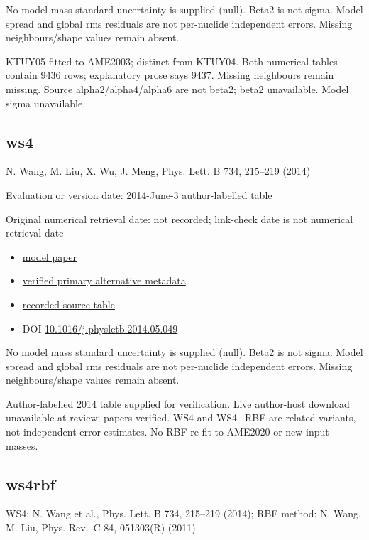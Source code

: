 \documentclass[
  11pt,
  letterpaper,
]{article}
\providecommand{\tightlist}{%
  \setlength{\itemsep}{0pt}\setlength{\parskip}{0pt}}
\begin{document}
No model mass standard uncertainty is supplied (null). Beta2 is not
sigma. Model spread and global rms residuals are not per-nuclide
independent errors. Missing neighbours/shape values remain absent.

KTUY05 fitted to AME2003; distinct from KTUY04. Both numerical tables
contain 9436 rows; explanatory prose says 9437. Missing neighbours
remain missing. Source alpha2/alpha4/alpha6 are not beta2; beta2
unavailable. Model sigma unavailable.

\subsection{ws4}\label{ws4}

N. Wang, M. Liu, X. Wu, J. Meng, Phys. Lett. B 734, 215--219 (2014)

Evaluation or version date: 2014-June-3 author-labelled table

Original numerical retrieval date: not recorded; link-check date is not
numerical retrieval date

\begin{itemize}
\tightlist
\item
  \href{https://doi.org/10.1016/j.physletb.2014.05.049}{model paper}
\item
  \href{https://arxiv.org/abs/1405.2616}{verified primary alternative
  metadata}
\item
  \href{http://www.imqmd.com/mass/}{recorded source table}
\item
  DOI
  \href{https://doi.org/10.1016/j.physletb.2014.05.049}{10.1016/j.physletb.2014.05.049}
\end{itemize}

No model mass standard uncertainty is supplied (null). Beta2 is not
sigma. Model spread and global rms residuals are not per-nuclide
independent errors. Missing neighbours/shape values remain absent.

Author-labelled 2014 table supplied for verification. Live author-host
download unavailable at review; papers verified. WS4 and WS4+RBF are
related variants, not independent error estimates. No RBF re-fit to
AME2020 or new input masses.

\subsection{ws4rbf}\label{ws4rbf}

WS4: N. Wang et al., Phys. Lett. B 734, 215--219 (2014); RBF method: N.
Wang, M. Liu, Phys. Rev.~C 84, 051303(R) (2011)
\end{document}
